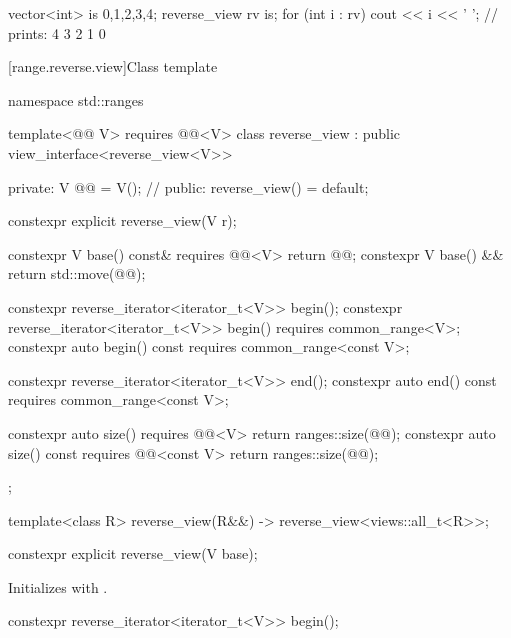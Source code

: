 \pnum
\begin{example}
\begin{codeblock}
vector<int> is {0,1,2,3,4};
reverse_view rv {is};
for (int i : rv)
  cout << i << ' '; // prints: 4 3 2 1 0
\end{codeblock}
\end{example}

[range.reverse.view]{Class template }

%
%
%
\begin{codeblock}
namespace std::ranges {
  template<@@ V>
    requires @@<V>
  class reverse_view : public view_interface<reverse_view<V>> {
  private:
    V @@ = V();  // \expos
  public:
    reverse_view() = default;

    constexpr explicit reverse_view(V r);

    constexpr V base() const& requires @@<V> { return @@; }
    constexpr V base() && { return std::move(@@); }

    constexpr reverse_iterator<iterator_t<V>> begin();
    constexpr reverse_iterator<iterator_t<V>> begin() requires common_range<V>;
    constexpr auto begin() const requires common_range<const V>;

    constexpr reverse_iterator<iterator_t<V>> end();
    constexpr auto end() const requires common_range<const V>;

    constexpr auto size() requires @@<V> {
      return ranges::size(@@);
    }
    constexpr auto size() const requires @@<const V> {
      return ranges::size(@@);
    }
  };

  template<class R>
    reverse_view(R&&) -> reverse_view<views::all_t<R>>;
}
\end{codeblock}

%
\begin{itemdecl}
constexpr explicit reverse_view(V base);
\end{itemdecl}

\begin{itemdescr}
\pnum
\effects
Initializes  with .
\end{itemdescr}

%
\begin{itemdecl}
constexpr reverse_iterator<iterator_t<V>> begin();
\end{itemdecl}

